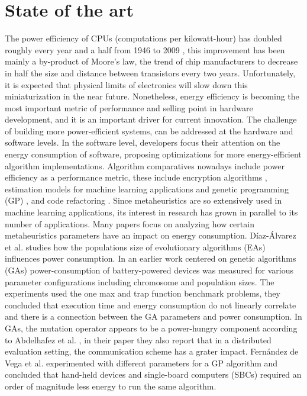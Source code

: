 \documentclass[a4paper,twoside]{article}
\begin{document}
\section{State of the art}


The power efficiency of CPUs (computations per kilowatt-hour) has
doubled roughly every year and a half from 1946 to 2009
\cite{koomey2011web}, this improvement has been mainly a by-product
of Moore's law, the trend of chip manufacturers to decrease in half
the size and distance between transistors every two
years. Unfortunately, it is expected that physical limits of
electronics will slow down this miniaturization in the near future.
Nonetheless, energy efficiency is becoming the most important metric
of performance and selling point in hardware development, and it is an
important driver for current innovation. The challenge of building
more power-efficient systems, can be addressed at the hardware and
software levels. In the software level, developers focus their
attention on the energy consumption of software, proposing
optimizations for more energy-efficient algorithm implementations.
Algorithm comparatives nowadays include power efficiency as a
performance metric, these include encryption algorithms
\cite{mota2017comparative,thakor2021lightweight}, estimation models
for machine learning applications \cite{garcia2019estimation} and
genetic programming (GP) \cite{diaz2018fuzzy}, and code refactoring
\cite{ournani2021tales}. Since metaheuristics are so extensively used
in machine learning applications, its interest in research has grown
in parallel to its number of applications. Many papers focus on
analyzing how certain metaheuristics parameters have an impact on
energy consumption.  Díaz-Álvarez et al. \cite{diaz2022population}
studies how the populations size of evolutionary algorithms (EAs)
influences power consumption. In an earlier work centered on genetic
algorithms (GAs) \cite{10.1007/978-3-030-45715-0_8} power-consumption
of battery-powered devices was measured for various parameter
configurations including chromosome and population sizes. The
experiments used the one max and trap function benchmark problems,
they concluded that execution time and energy consumption do not
linearly correlate and there is a connection between the GA parameters
and power consumption.  In GAs, the mutation operator appears to be a
power-hungry component according to Abdelhafez et
al. \cite{abdelhafez2019component}, in their paper they also report
that in a distributed evaluation setting, the communication scheme has
a grater impact. Fernández de Vega et
al. \cite{10.1007/978-3-319-45823-6_51} experimented with different
parameters for a GP algorithm and concluded that hand-held devices and
single-board computers (SBCs) required an order of magnitude less
energy to run the same algorithm.
\end{document}
